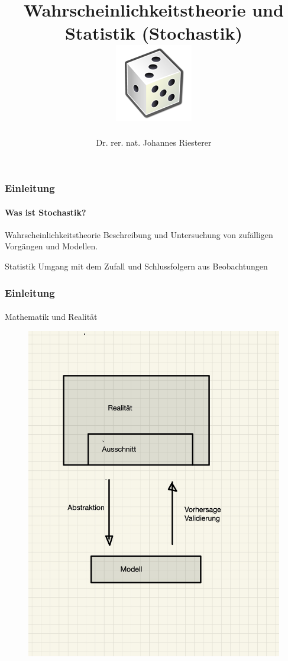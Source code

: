 \documentclass{beamer}
\begin{document}
\title[Stochastik] %
{Wahrscheinlichkeitstheorie und Statistik (Stochastik)
\\
\includegraphics[scale=0.5]{img/craps}
}
\subtitle{}
\author[Dr. Johannes Riesterer] %
{Dr.  rer. nat. Johannes Riesterer}

\date[KPT 2004] %
{}

\subject{Stochastik}

\frame{\titlepage}

\begin{frame}
    \frametitle{Einleitung}
\framesubtitle{Was ist Stochastik?}
    \begin{block}{Wahrscheinlichkeitstheorie}
 Beschreibung und Untersuchung von zufälligen Vorgängen und Modellen.
\end{block}
    \begin{block}{Statistik}
Umgang mit dem Zufall und Schlussfolgern aus Beobachtungen
\end{block}
 \end{frame}

\begin{frame}
    \frametitle{Einleitung}
\framesubtitle{}
    \begin{block}{Mathematik und Realität}

\begin{figure}[htp]
      \centering
    \includegraphics[width=0.5 \textwidth]{img/modellierung}

 
\end{figure}
\end{block}
 
 \end{frame}
\end{document}
